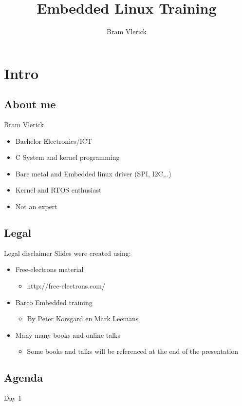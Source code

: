 \documentclass[11pt]{beamer}
\author{Bram Vlerick}
\title{Embedded Linux Training}
\institute{Barco N.V.}
\begin{document}
\begin{frame}
\titlepage
\end{frame}


\section{Intro}
\subsection{About me}
\begin{frame}{Bram Vlerick}
\begin{itemize}
\item Bachelor Electronics/ICT
\item C System and kernel programming
\item Bare metal and Embedded linux driver (SPI, I2C,..)
\item Kernel and RTOS enthusiast
\item Not an expert
\end{itemize}
\end{frame}

\subsection{Legal}
\begin{frame}{Legal disclaimer}
Slides were created using:
\begin{itemize}
\item Free-electrons material
\begin{itemize}
\item http://free-electrons.com/
\end{itemize}
\item Barco Embedded training
\begin{itemize}
\item By Peter Korsgard en Mark Leemans
\end{itemize}
\item Many many books and online talks
\begin{itemize}
\item Some books and talks will be referenced at the end of the presentation
\end{itemize}
\end{itemize}
\end{frame}

\subsection{Agenda}
\begin{frame}{Day 1}

\end{frame}
\end{document}
